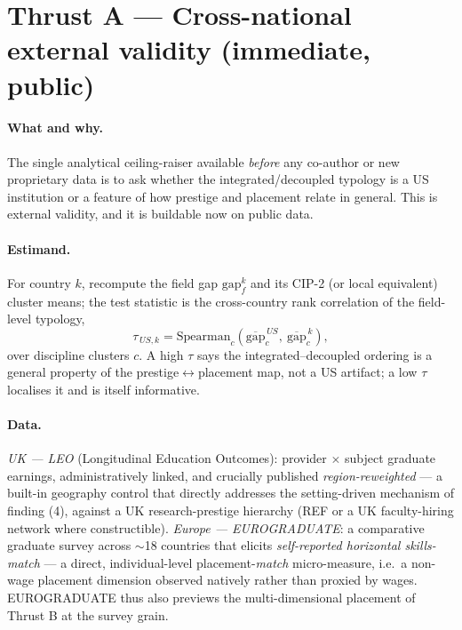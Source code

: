 \documentclass[11pt]{article}
\begin{document}
\section{Thrust A --- Cross-national external validity (immediate, public)}\label{sec:thrustA}
\paragraph{What and why.} The single analytical ceiling-raiser available \emph{before} any co-author or new
proprietary data is to ask whether the integrated/decoupled typology is a US institution or a feature of how
prestige and placement relate in general. This is external validity, and it is buildable now on public data.

\paragraph{Estimand.} For country $k$, recompute the field gap $\mathrm{gap}^{k}_f$ and its CIP-2 (or local
equivalent) cluster means; the test statistic is the cross-country rank correlation of the field-level typology,
\[
\tau_{\,US,k} = \mathrm{Spearman}_c\!\left(\overline{\mathrm{gap}}^{\,US}_c,\ \overline{\mathrm{gap}}^{\,k}_c\right),
\]
over discipline clusters $c$. A high $\tau$ says the integrated--decoupled ordering is a general property of the
prestige$\leftrightarrow$placement map, not a US artifact; a low $\tau$ localises it and is itself informative.

\paragraph{Data.} \emph{UK --- LEO} (Longitudinal Education Outcomes): provider $\times$ subject graduate earnings,
administratively linked, and crucially published \emph{region-reweighted} --- a built-in geography control that
directly addresses the setting-driven mechanism of finding (4), against a UK research-prestige hierarchy (REF or a
UK faculty-hiring network where constructible). \emph{Europe --- EUROGRADUATE}: a comparative graduate survey
across $\sim$18 countries that elicits \emph{self-reported horizontal skills-match} --- a direct, individual-level
placement-\emph{match} micro-measure, i.e.\ a non-wage placement dimension observed natively rather than proxied by
wages. EUROGRADUATE thus also previews the multi-dimensional placement of Thrust B at the survey grain.
\end{document}
